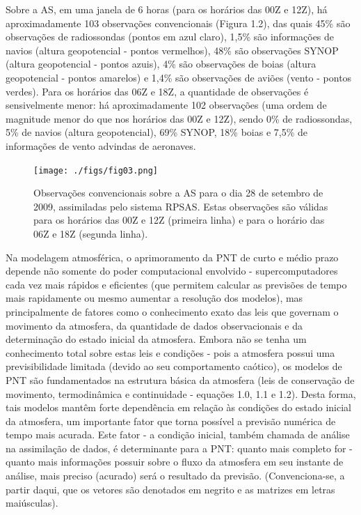 Sobre a AS, em uma janela de 6 horas (para os horários das 00Z e 12Z), há aproximadamente 103 observações convencionais (Figura 1.2), das quais 45\% são observações de radiossondas (pontos em azul claro), 1,5\% são informações de navios (altura geopotencial - pontos vermelhos), 48\% são observações SYNOP (altura geopotencial - pontos azuis), 4\% são observações de boias (altura geopotencial - pontos amarelos) e 1,4\% são observações de aviões (vento - pontos verdes). Para os horários das 06Z e 18Z, a quantidade de observações é sensivelmente menor: há aproximadamente 102 observações (uma ordem de magnitude menor do que nos horários das 00Z e 12Z), sendo 0\% de radiossondas, 5\% de navios (altura geopotencial), 69\% SYNOP, 18\% boias e 7,5\% de informações de vento advindas de aeronaves.

\begin{figure}
\centering
\texttt{[image: ./figs/fig03.png]}
\caption{Observações convencionais sobre a AS para o dia 28 de setembro de 2009, assimiladas pelo sistema RPSAS. Estas observações são válidas para os horários das 00Z e 12Z (primeira linha) e para o horário das 06Z e 18Z (segunda linha).}
\label{fig03}
\end{figure}

Na modelagem atmosférica, o aprimoramento da PNT de curto e médio prazo depende não somente do poder computacional envolvido - supercomputadores cada vez mais rápidos e eficientes (que permitem calcular as previsões de tempo mais rapidamente ou mesmo aumentar a resolução dos modelos), mas principalmente de fatores como o conhecimento exato das leis que governam o movimento da atmosfera, da quantidade de dados observacionais e da determinação do estado inicial da atmosfera.  Embora não se tenha um conhecimento total sobre estas leis e condições - pois a atmosfera possui uma previsibilidade limitada (devido ao seu comportamento caótico), os modelos de PNT são fundamentados na estrutura básica da atmosfera (leis de conservação de movimento, termodinâmica e continuidade - equações 1.0, 1.1 e 1.2). Desta forma, tais modelos mantêm forte dependência em relação às condições do estado inicial da atmosfera, um importante fator que torna possível a previsão numérica de tempo mais acurada. Este fator - a condição inicial, também chamada de análise na assimilação de dados, é determinante para a PNT: quanto mais completo for - quanto mais informações possuir sobre o fluxo da atmosfera em seu instante de análise, mais preciso (acurado) será o resultado da previsão. (Convenciona-se, a partir daqui, que os vetores são denotados em negrito e as matrizes em letras maiúsculas).

